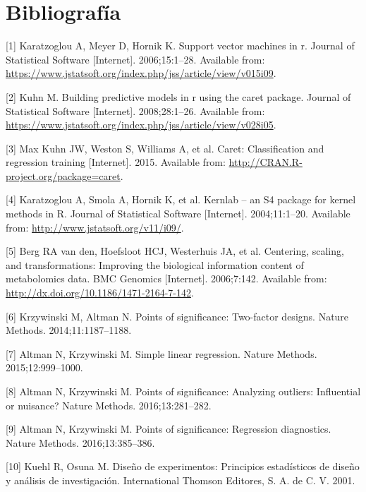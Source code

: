 \documentclass[12pt,spanish,a4paper]{article}
\numberwithin{equation}{section}
\begin{document}
\section*{Bibliografía}\label{bibliografia}

\hypertarget{refs}{}
\hypertarget{ref-JSSv015i09}{}
{[}1{]} Karatzoglou A, Meyer D, Hornik K. Support vector machines in r.
Journal of Statistical Software {[}Internet{]}. 2006;15:1--28. Available
from:
\url{https://www.jstatsoft.org/index.php/jss/article/view/v015i09}.

\hypertarget{ref-JSSv028i05}{}
{[}2{]} Kuhn M. Building predictive models in r using the caret package.
Journal of Statistical Software {[}Internet{]}. 2008;28:1--26. Available
from:
\url{https://www.jstatsoft.org/index.php/jss/article/view/v028i05}.

\hypertarget{ref-caret2015}{}
{[}3{]} Max Kuhn JW, Weston S, Williams A, et al. Caret: Classification
and regression training {[}Internet{]}. 2015. Available from:
\url{http://CRAN.R-project.org/package=caret}.

\hypertarget{ref-kernlab2004}{}
{[}4{]} Karatzoglou A, Smola A, Hornik K, et al. Kernlab -- an S4
package for kernel methods in R. Journal of Statistical Software
{[}Internet{]}. 2004;11:1--20. Available from:
\url{http://www.jstatsoft.org/v11/i09/}.

\hypertarget{ref-vandenBerg2006}{}
{[}5{]} Berg RA van den, Hoefsloot HCJ, Westerhuis JA, et al. Centering,
scaling, and transformations: Improving the biological information
content of metabolomics data. BMC Genomics {[}Internet{]}. 2006;7:142.
Available from: \url{http://dx.doi.org/10.1186/1471-2164-7-142}.

\hypertarget{ref-krzywinskipostd2014}{}
{[}6{]} Krzywinski M, Altman N. Points of significance: Two-factor
designs. Nature Methods. 2014;11:1187--1188.

\hypertarget{ref-altmanslr2015}{}
{[}7{]} Altman N, Krzywinski M. Simple linear regression. Nature
Methods. 2015;12:999--1000.

\hypertarget{ref-altman2016a}{}
{[}8{]} Altman N, Krzywinski M. Points of significance: Analyzing
outliers: Influential or nuisance? Nature Methods. 2016;13:281--282.

\hypertarget{ref-altman2016b}{}
{[}9{]} Altman N, Krzywinski M. Points of significance: Regression
diagnostics. Nature Methods. 2016;13:385--386.

\hypertarget{ref-kuehl2001}{}
{[}10{]} Kuehl R, Osuna M. Diseño de experimentos: Principios
estadísticos de diseño y análisis de investigación. International
Thomson Editores, S. A. de C. V. 2001.
\end{document}
